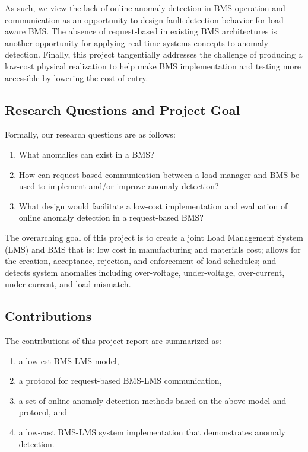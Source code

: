 \documentclass[11pt,conference,draftcls,onecolumn]{IEEEtran}
\begin{document}
As such, we view the lack of online anomaly detection in BMS operation and communication as an opportunity to design fault-detection behavior for load-aware BMS.
The absence of request-based in existing BMS architectures is another opportunity for applying real-time systems concepts to anomaly detection.
Finally, this project tangentially addresses the challenge of producing a low-cost physical realization to help make BMS implementation and testing more accessible by lowering the cost of entry.

\subsection{Research Questions and Project Goal}
Formally, our research questions are as follows:
\begin{enumerate}
    \item What anomalies can exist in a BMS?
    \item How can request-based communication between a load manager and BMS be used to implement and/or improve anomaly detection?
    \item What design would facilitate a low-cost implementation and evaluation of online anomaly detection in a request-based BMS?
\end{enumerate}

The overarching goal of this project is to create a joint Load Management System (LMS) and BMS that is: low cost in manufacturing and materials cost;
allows for the creation, acceptance, rejection, and enforcement of load schedules;
and detects system anomalies including over-voltage, under-voltage, over-current, under-current, and load mismatch.

\subsection{Contributions}
The contributions of this project report are summarized as:
\begin{enumerate}
    \item a low-cst BMS-LMS model,
    \item a protocol for request-based BMS-LMS communication,
    \item a set of online anomaly detection methods based on the above model and protocol, and
    \item a low-cost BMS-LMS system implementation that demonstrates anomaly detection.
\end{enumerate}
\end{document}
